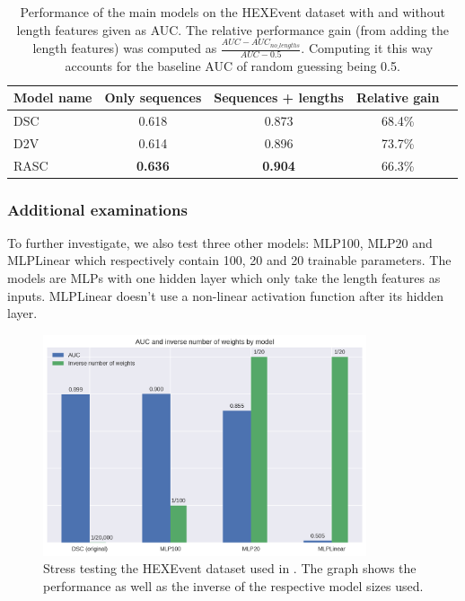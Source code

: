 
\begin{table}
	\centering
		\begin{tabular}[width=\textwidth]{| l | c | c | c| c} 
			\hline
			Model name & Only sequences & Sequences + lengths & Relative gain\\
			\hline
			DSC & 0.618 & 0.873 & 68.4\%\\
			D2V & 0.614 & 0.896 & 73.7\%\\
			RASC & \textbf{0.636} & \textbf{0.904} & 66.3\%\\
			\hline
		\end{tabular}
	\caption{Performance of the main models on the HEXEvent dataset with and without length features given as AUC. The relative performance gain (from adding the length features) was computed as $\frac{AUC - AUC_{no\_lengths}}{AUC - 0.5}$. Computing it this way accounts for the baseline AUC of random guessing being 0.5.
	}
	\label{table:results_hexevent}
\end{table}

\subsubsection{Additional examinations}
To further investigate, we also test three other models: MLP100, MLP20 and MLPLinear which respectively contain 100, 20 and 20 trainable parameters. The models are MLPs with one hidden layer which only take the length features as inputs. MLPLinear doesn't use a non-linear activation function after its hidden layer.

\begin{figure}
	\centering\includegraphics[width=0.85\textwidth]{../visualizations/ch5-results/dsc_funeral_barchart.png} 
	\caption{Stress testing the HEXEvent dataset used in \cite{dsc}. The graph shows the performance as well as the inverse of the respective model sizes used.}
	\label{fig:dsc_funeral}
\end{figure}

